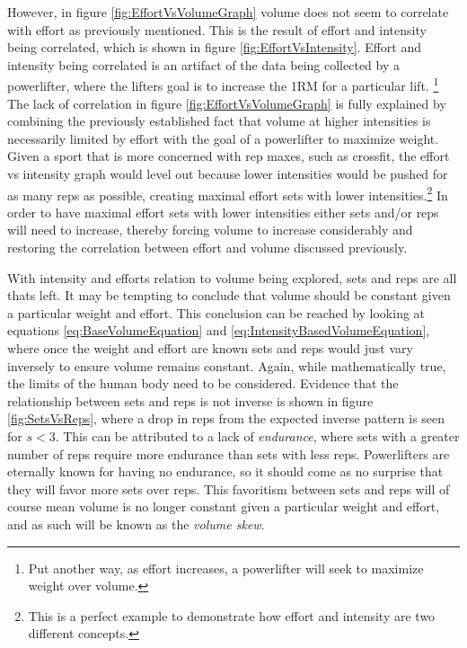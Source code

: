 However, in figure \ref{fig:EffortVsVolumeGraph} volume does not seem to correlate with effort as previously mentioned. This is the result of effort and intensity being correlated, which is shown in figure \ref{fig:EffortVsIntensity}. Effort and intensity being correlated is an artifact of the data being collected by a powerlifter, where the lifters goal is to increase the 1RM for a particular lift. \footnote{Put another way, as effort increases, a powerlifter will seek to maximize weight over volume.} The lack of correlation in figure \ref{fig:EffortVsVolumeGraph} is fully explained by combining the previously established fact that volume at higher intensities is necessarily limited by effort with the goal of a powerlifter to maximize weight. Given a sport that is more concerned with rep maxes, such as crossfit, the effort vs intensity graph would level out because lower intensities would be pushed for as many reps as possible, creating maximal effort sets with lower intensities.\footnote{This is a perfect example to demonstrate how effort and intensity are two different concepts.} In order to have maximal effort sets with lower intensities either sets and/or reps will need to increase, thereby forcing volume to increase considerably and restoring the correlation between effort and volume discussed previously.

With intensity and efforts relation to volume being explored, sets and reps are all thats left. It may be tempting to conclude that volume should be constant given a particular weight and effort. This conclusion can be reached by looking at equations \ref{eq:BaseVolumeEquation} and \ref{eq:IntensityBasedVolumeEquation}, where once the weight and effort are known sets and reps would just vary inversely to ensure volume remains constant. Again, while mathematically true, the limits of the human body need to be considered. Evidence that the relationship between sets and reps is not inverse is shown in figure \ref{fig:SetsVsReps}, where a drop in reps from the expected inverse pattern is seen for $s<3$. This can be attributed to a lack of \textit{endurance}, where sets with a greater number of reps  require more endurance than sets with less reps. Powerlifters are eternally known for having no endurance, so it should come as no surprise that they will favor more sets over reps. This favoritism between sets and reps will of course mean volume is no longer constant given a particular weight and effort, and as such will be known as the \textit{volume skew}.

